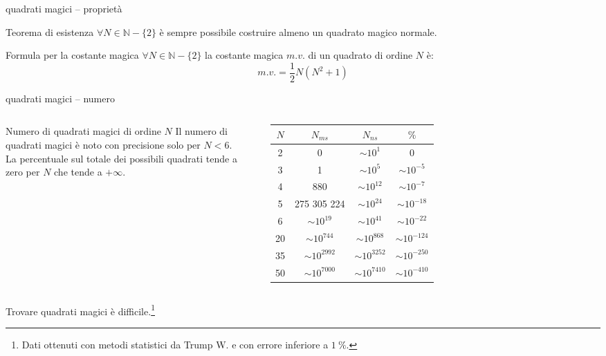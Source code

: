 \documentclass[10pt]{beamer}
\begin{document}
\begin{frame}{quadrati magici -- proprietà}
	\begin{alertblock}{Teorema di esistenza}
		$ \forall N \in \mathbb{N} - \{2\} $ è sempre possibile costruire almeno un quadrato magico normale.
	\end{alertblock}

	\begin{alertblock}{Formula per la costante magica}
		$ \forall N \in \mathbb{N} - \{2\} $ la costante magica $ m.v. $ di un quadrato di ordine $ N $ è:
		\begin{equation*}\label{equa:costante_magica}
		 \mathit{m.v.} = \frac{1}{2} N (N^2 + 1)
		\end{equation*}
	\end{alertblock}
\end{frame}


\begin{frame}{quadrati magici -- numero}
	\begin{columns}

	\begin{block}{Numero di quadrati magici di ordine $ N $}
		Il numero di quadrati magici è noto con precisione solo per $ N<6 $. \\
		La percentuale sul totale dei possibili quadrati tende a zero per $ N $ che tende a $ +\infty $.
	\end{block}

		\begin{tabular}{cccc} \toprule
			$ N $ &       $ N_{ms} $        &       $ N_{ns} $        &  $ \si{\percent} $   \\ \midrule
			2   &            0            &    $ \sim  10^{1} $     &          0           \\
			3   &            1            &     $ \sim 10^{5} $     &   $ \sim 10^{-5} $   \\
			4   &           880           &    $ \sim 10^{12} $     &   $ \sim 10^{-7} $   \\
			5   &       275 305 224       &    $ \sim 10^{24} $     &  $ \sim 10^{-18} $   \\
			6   &    $ \sim 10^{19} $     &    $ \sim 10^{41} $     &  $ \sim 10^{-22} $   \\
			20   &    $ \sim 10^{744} $    &    $ \sim 10^{868} $    &  $ \sim 10^{-124} $  \\
			35   &   $ \sim 10^{2992} $    &   $ \sim 10^{3252} $    &  $ \sim 10^{-250} $  \\
			50   &   $ \sim 10^{7000} $    &   $ \sim 10^{7410} $    &  $ \sim 10^{-410} $\\ \bottomrule
		\end{tabular}
	\end{columns}
	\centering
	Trovare quadrati magici è \alert{difficile}.\footnote{Dati ottenuti con metodi statistici da Trump W. e con errore inferiore a $ \SI{1}{\percent} $.}
\end{frame}
\end{document}

